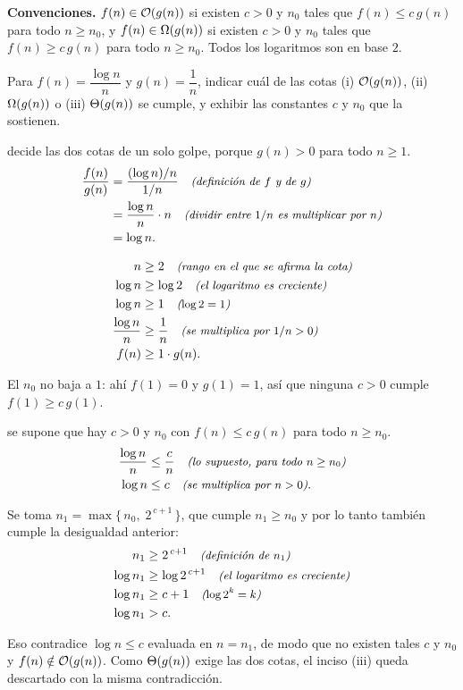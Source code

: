 \documentclass[11pt,letterpaper]{article}
\begin{document}

\noindent\textbf{Convenciones.}
$f(n) \in \mathcal{O}\!\left(g(n)\right)$ si existen $c > 0$ y $n_0$ tales que
$f(n) \le c\,g(n)$ para todo $n \ge n_0$, y
$f(n) \in \Omega\!\left(g(n)\right)$ si existen $c > 0$ y $n_0$ tales que
$f(n) \ge c\,g(n)$ para todo $n \ge n_0$. Todos los logaritmos son en base $2$.

\noindent Para $f(n) = \dfrac{\log n}{n}$ y $g(n) = \dfrac{1}{n}$,
indicar cuál de las cotas (i) $\mathcal{O}\!\left(g(n)\right)$, (ii) $\Omega\!\left(g(n)\right)$ o
(iii) $\Theta\!\left(g(n)\right)$ se cumple, y exhibir las constantes $c$ y $n_0$
que la sostienen.

 decide las dos cotas de un solo
golpe, porque $g(n) > 0$ para todo $n \ge 1$.
\begin{align*}
  \frac{f(n)}{g(n)}
    &= \frac{(\log n)/n}{1/n}
       \quad\text{\small\itshape (definición de $f$ y de $g$)} \\
    &= \frac{\log n}{n} \cdot n
       \quad\text{\small\itshape (dividir entre $1/n$ es multiplicar por $n$)} \\
    &= \log n.
\end{align*}

\begin{align*}
  n &\ge 2
     \quad\text{\small\itshape (rango en el que se afirma la cota)} \\
  \log n &\ge \log 2
     \quad\text{\small\itshape (el logaritmo es creciente)} \\
  \log n &\ge 1
     \quad\text{\small\itshape ($\log 2 = 1$)} \\
  \frac{\log n}{n} &\ge \frac{1}{n}
     \quad\text{\small\itshape (se multiplica por $1/n > 0$)} \\
  f(n) &\ge 1 \cdot g(n).
\end{align*}

El $n_0$ no baja a $1$: ahí $f(1) = 0$ y $g(1) = 1$, así que ninguna
$c > 0$ cumple $f(1) \ge c\,g(1)$.

 se supone que hay $c > 0$ y $n_0$ con
$f(n) \le c\,g(n)$ para todo $n \ge n_0$.
\begin{align*}
  \frac{\log n}{n} &\le \frac{c}{n}
     \quad\text{\small\itshape (lo supuesto, para todo $n \ge n_0$)} \\
  \log n &\le c
     \quad\text{\small\itshape (se multiplica por $n > 0$)}.
\end{align*}

Se toma $n_1 = \max\{\,n_0,\; 2^{\,c+1}\,\}$, que cumple $n_1 \ge n_0$
y por lo tanto también cumple la desigualdad anterior:
\begin{align*}
  n_1 &\ge 2^{\,c+1}
     \quad\text{\small\itshape (definición de $n_1$)} \\
  \log n_1 &\ge \log 2^{\,c+1}
     \quad\text{\small\itshape (el logaritmo es creciente)} \\
  \log n_1 &\ge c + 1
     \quad\text{\small\itshape ($\log 2^{k} = k$)} \\
  \log n_1 &> c.
\end{align*}

Eso contradice $\log n \le c$ evaluada en $n = n_1$, de modo que no
existen tales $c$ y $n_0$ y $f(n) \notin \mathcal{O}\!\left(g(n)\right)$. Como
$\Theta\!\left(g(n)\right)$ exige las dos cotas, el inciso (iii) queda descartado con
la misma contradicción.

\end{document}
